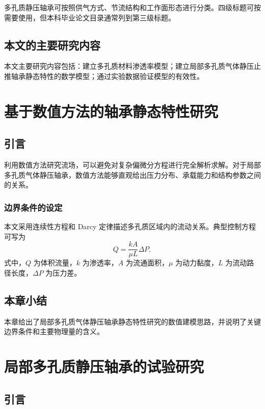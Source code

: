 多孔质静压轴承可按照供气方式、节流结构和工作面形态进行分类。四级标题可按需要使用，但本科毕业论文目录通常列到第三级标题。

\section{本文的主要研究内容}

本文主要研究内容包括：建立多孔质材料渗透率模型；建立局部多孔质气体静压止推轴承静态特性的数学模型；通过实验数据验证模型的有效性。

\chapter{基于数值方法的轴承静态特性研究}

\section{引言}

利用数值方法研究流场，可以避免对复杂偏微分方程进行完全解析求解。对于局部多孔质气体静压轴承，数值方法能够直观给出压力分布、承载能力和结构参数之间的关系。

\subsection{边界条件的设定}

本文采用连续性方程和 Darcy 定律描述多孔质区域内的流动关系。典型控制方程可写为
\begin{equation}
  Q = \frac{kA}{\mu L}\Delta P ,
  \label{eq:darcy}
\end{equation}
式中，$Q$ 为体积流量，$k$ 为渗透率，$A$ 为流通面积，$\mu$ 为动力黏度，$L$ 为流动路径长度，$\Delta P$ 为压力差。

\section{本章小结}

本章给出了局部多孔质气体静压轴承静态特性研究的数值建模思路，并说明了关键边界条件和主要物理量的含义。

\chapter{局部多孔质静压轴承的试验研究}

\section{引言}

